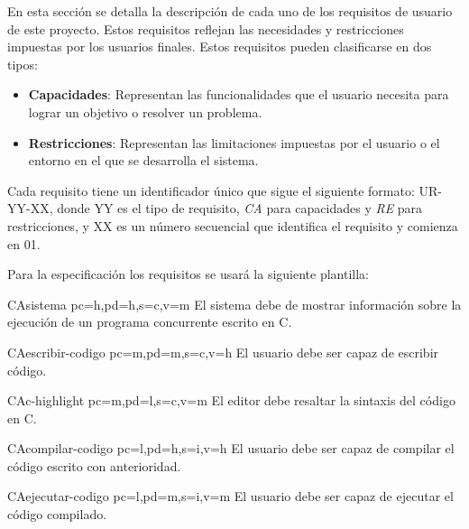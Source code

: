 En esta sección se detalla la descripción de cada uno de los requisitos de usuario de este proyecto. Estos requisitos reflejan las necesidades y restricciones impuestas por los usuarios finales. Estos requisitos pueden clasificarse en dos tipos:
\begin{itemize}
    \item \textbf{Capacidades}: Representan las funcionalidades que el usuario necesita para lograr un objetivo o resolver un problema.
    \item \textbf{Restricciones}: Representan las limitaciones impuestas por el usuario o el entorno en el que se desarrolla el sistema.
\end{itemize}

Cada requisito tiene un identificador único que sigue el siguiente formato: UR-YY-XX, donde YY es el tipo de requisito, \textit{CA} para capacidades y \textit{RE} para restricciones, y XX es un número secuencial que identifica el requisito y comienza en 01.

Para la especificación los requisitos se usará la siguiente plantilla:

\printureqtemplate{}

\begin{userReq}{CA}{sistema}
    {pc=h,pd=h,s=c,v=m}
    El sistema debe de mostrar información sobre la ejecución de un \gls{programa concurrente} escrito en C.
\end{userReq}

\begin{userReq}{CA}{escribir-codigo}
    {pc=m,pd=m,s=c,v=h}
    El usuario debe ser capaz de escribir código.
\end{userReq}

\begin{userReq}{CA}{c-highlight}
    {pc=m,pd=l,s=c,v=m}
    El editor debe resaltar la sintaxis del código en C.
\end{userReq}

\begin{userReq}{CA}{compilar-codigo}
    {pc=l,pd=h,s=i,v=h}
    El usuario debe ser capaz de compilar el código escrito con anterioridad.
\end{userReq}

\begin{userReq}{CA}{ejecutar-codigo}
    {pc=l,pd=m,s=i,v=m}
    El usuario debe ser capaz de ejecutar el código compilado.
\end{userReq}

